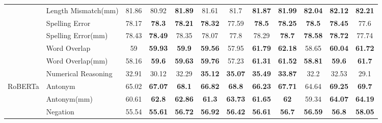 \begin{table}[]
\begin{tabular}{|c|l|c|c|c|c|c|c|c|c|c|c|}
                                                & Length Mismatch(mm)          & 81.86                     & 80.92                          & \textbf{81.89} & 81.61 & 81.7  & \textbf{81.87} & \textbf{81.99} & \textbf{82.04} & \textbf{82.12} & \textbf{82.21} \\ \cline{2-12} 
                                                & Spelling Error               & 78.17                     & \textbf{78.3}                  & \textbf{78.21} & \textbf{78.32} & 77.59          & \textbf{78.5}  & \textbf{78.25} & \textbf{78.5}  & \textbf{78.45} & 77.6           \\ \cline{2-12} 
                                                & Spelling Error(mm)           & 78.43                     & \textbf{78.49}                 & 78.35 & 78.07 & 77.8           & 78.29          & \textbf{78.7}  & \textbf{78.58} & \textbf{78.72} & 77.74          \\ \cline{2-12} 
                                                & Word Overlap                 & 59                        & \textbf{59.93}                 & \textbf{59.9}  & \textbf{59.56} & 57.95 & \textbf{61.79} & \textbf{62.18} & 58.65 & \textbf{60.04} & \textbf{61.72} \\ \cline{2-12} 
                                                & Word Overlap(mm)             & 58.16                     & \textbf{59.6}                  & \textbf{59.63} & \textbf{59.76} & 57.23 & \textbf{61.31} & \textbf{61.52} & \textbf{58.81} & \textbf{59.6}  & \textbf{61.7}  \\ \cline{2-12} 
                                                & Numerical Reasoning          & 32.91                     & 30.12                 & 32.29          & \textbf{35.12} & \textbf{35.07} & \textbf{35.49} & \textbf{33.87} & 32.2  & 32.53 & 29.1           \\ \hline
\multicolumn{1}{|l|}{\multirow{11}{*}{RoBERTa}} & Antonym                      & 65.02                     & \textbf{67.07}                 & \textbf{68.1}  & \textbf{66.82} & \textbf{68.8}  & \textbf{66.23} & \textbf{67.71} & 64.64          & \textbf{69.25} & \textbf{69.7}  \\ \cline{2-12} 
\multicolumn{1}{|l|}{}                          & Antonym(mm)                  & 60.61                     & \textbf{62.8}                  & \textbf{62.86} & \textbf{61.3}  & \textbf{63.73} & \textbf{61.65} & \textbf{62}    & 59.34          & \textbf{64.07} & \textbf{64.19} \\ \cline{2-12} 
\multicolumn{1}{|l|}{}                          & Negation                     & 55.54                     & \textbf{55.61}                 & \textbf{56.72} & \textbf{56.92} & \textbf{56.42} & \textbf{56.61} & \textbf{56.7}  & \textbf{56.59} & \textbf{56.8}  & \textbf{58.05} \\ \cline{2-12} 

\end{tabular}
\end{table}
